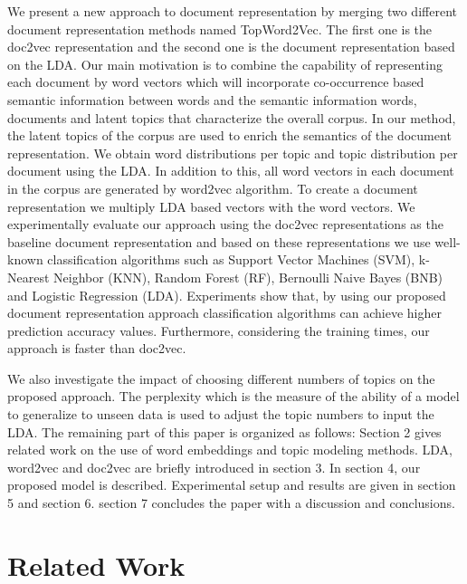 \documentclass[a4paper,fleqn]{cas-dc}
\begin{document}
We present a new approach to document representation by merging two different document representation methods named TopWord2Vec. The first one is the doc2vec representation \citep{ref3} and the second one is the document representation based on the LDA. Our main motivation is to combine the capability of representing each document by word vectors which will incorporate co-occurrence based semantic information between words and the semantic information words, documents and latent topics that characterize the overall corpus. In our method, the latent topics of the corpus are used to enrich the semantics of the document representation. We obtain word distributions per topic and topic distribution per document using the LDA. In addition to this, all word vectors in each document in the corpus are generated by word2vec algorithm. To create a document representation we multiply LDA based vectors with the word vectors. We experimentally evaluate our approach using the doc2vec representations as the baseline document representation and based on these representations we use well-known classification algorithms such as Support Vector Machines (SVM), k-Nearest Neighbor (KNN), Random Forest (RF), Bernoulli Naive Bayes (BNB) and Logistic Regression (LDA). Experiments show that, by using our proposed document representation approach classification algorithms can achieve higher prediction accuracy values. Furthermore, considering the training times, our approach is faster than doc2vec.

We also investigate the impact of choosing different numbers of topics on the proposed approach. The perplexity which is the measure of the ability of a model to generalize to unseen data \citep{ref7} is used to adjust the topic numbers to input the LDA.
The remaining part of this paper is organized as follows: Section 2 gives related work on the use of word embeddings and topic modeling methods. LDA, word2vec and doc2vec are briefly introduced in section 3. In section 4, our proposed model is described. Experimental setup and results are given in section 5 and section 6. section 7 concludes the paper with a discussion and conclusions.

\section{Related Work}
\end{document}
